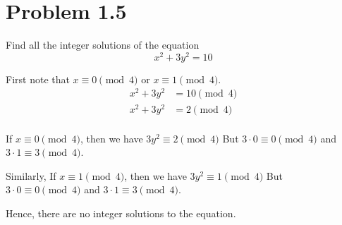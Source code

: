 \section*{Problem 1.5}
Find all the integer solutions of the equation
\[ x^2 + 3y^2 = 10 \]

First note that $x \equiv 0 \pmod 4$ or $x \equiv 1 \pmod 4$.
\begin{align*}
  x^2 + 3y^2 &= 10 \pmod 4 \\
  x^2 + 3y^2 &= 2 \pmod 4 \\
\end{align*}

If $x \equiv 0 \pmod 4$, then we have $3y^2 \equiv 2 \pmod 4$
But $3 \cdot 0 \equiv 0 \pmod 4$ and $3 \cdot 1 \equiv 3 \pmod 4$.

Similarly, If $x \equiv 1 \pmod 4$, then we have $3y^2 \equiv 1 \pmod 4$
But $3 \cdot 0 \equiv 0 \pmod 4$ and $3 \cdot 1 \equiv 3 \pmod 4$.

Hence, there are no integer solutions to the equation.

